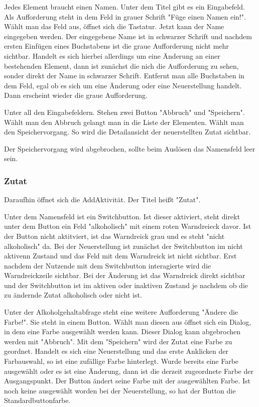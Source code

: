 {Jedes Element braucht einen Namen. Unter dem Titel gibt es ein Eingabefeld. Als Aufforderung steht in dem Feld in grauer Schrift "Füge einen Namen ein!". Wählt man das Feld aus, öffnet sich die Tastatur. Jetzt kann der Name eingegeben werden. Der eingegebene Name ist in schwarzer Schrift und nachdem ersten Einfügen eines Buchstabens ist die graue Aufforderung nicht mehr sichtbar. Handelt es sich hierbei allerdings um eine Änderung an einer bestehenden Element, dann ist zunächst die nich die Aufforderung zu sehen, sonder direkt der Name in schwarzer Schrift. Entfernt man alle Buchstaben in dem Feld, egal ob es sich um eine Änderung oder eine Neuerstellung handelt. Dann erscheint wieder die graue Aufforderung.

Unter all den Eingabefeldern. Stehen zwei Button "Abbruch" und "Speichern". Wählt man den Abbruch gelangt man in die Liste der Elementen. Wählt man den Speichervorgang. So wird die Detailansicht der neuerstellten Zutat sichtbar.

Der Speichervorgang wird abgebrochen, sollte beim Auslösen das Namensfeld leer sein.

\subsubsection{Zutat}

Daraufhin öffnet sich die AddAktivität. Der Titel heißt "Zutat".

Unter dem Namensfeld ist ein Switchbutton. Ist dieser aktiviert, steht direkt unter dem Button ein Feld "alkoholisch" mit einem roten Warndreieck davor. Ist der Button nicht aktitviert, ist das Warndreick grau und es steht "nicht alkoholisch" da. Bei der Neuerstellung ist zunächst der Switchbutton im nicht aktivenn Zustand und das Feld mit dem Warndreick ist nicht sichtbar. Erst nachdem der Nutzende mit dem Switchbutton interagierte wird die Warndreickzeile sichtbar. Bei der Änderung ist das Warndreick direkt sichtbar und der Switchbutton ist im aktiven oder inaktiven Zustand je nachdem ob die zu ändernde Zutat alkoholisch oder nicht ist.

Unter der Alkoholgehaltabfrage steht eine weitere Aufforderung "Ändere die Farbe!". Sie steht in einem Button. Wählt man diesen aus öffnet sich ein Dialog, in dem eine Farbe ausgewählt werden kann. Dieser Dialog kann abgebrochen werden mit "Abbruch". Mit dem "Speichern" wird der Zutat eine Farbe zu geordnet. Handelt es sich eine Neuerstellung und das erste Anklicken der Farbauswahl, so ist eine zufällige Farbe hinterlegt. Wurde bereits eine Farbe ausgewählt oder es ist eine Änderung, dann ist die derzeit zugeordnete Farbe der Ausgangspunkt. Der Button ändert seine Farbe mit der ausgewählten Farbe. Ist noch keine ausgewählt worden bei der Neuerstellung, so hat der Button die Standardbuttonfarbe.

}
